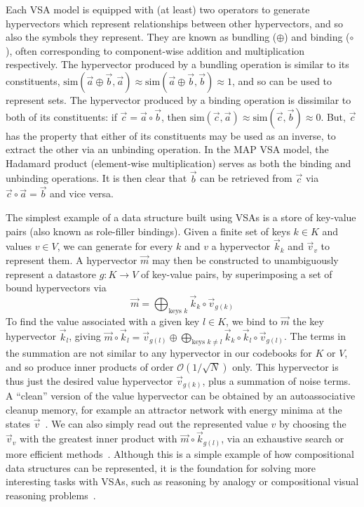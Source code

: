 Each VSA model is equipped with (at least) two operators to generate hypervectors which represent relationships between other hypervectors, and so also the symbols they represent. They are known as bundling ($\oplus$) and binding ($\circ$), often corresponding to component-wise addition and multiplication respectively. The hypervector produced by a bundling operation is similar to its constituents, $\mathrm{sim}(\vec{a} \oplus \vec{b}, \vec{a}) \approx \mathrm{sim}(\vec{a} \oplus \vec{b}, \vec{b}) \approx 1$, and so can be used to represent sets. The hypervector produced by a binding operation is dissimilar to both of its constituents: if $\vec{c} = \vec{a} \circ \vec{b}$, then  $\mathrm{sim}(\vec{c}, \vec{a}) \approx \mathrm{sim}(\vec{c}, \vec{b}) \approx 0$.
But, $\vec{c}$ has the property that either of its constituents may be used as an inverse, to extract the other via an unbinding operation. In the MAP VSA model, the Hadamard product (element-wise multiplication) serves as both the binding and unbinding operations. It is then clear that $\vec{b}$ can be retrieved from $\vec{c}$ via $\vec{c} \circ \vec{a} = \vec{b}$ and vice versa.

The simplest example of a data structure built using VSAs is a store of key-value pairs (also known as role-filler bindings). Given a finite set of keys $k \in K$ and values $v \in V$, we can generate for every $k$ and $v$ a hypervector $\vec{k}_k$ and $\vec{v}_v$ to represent them. A hypervector $\vec{m}$ may then be constructed to unambiguously represent a datastore $g : K \rightarrow V$ of key-value pairs, by superimposing a set of bound hypervectors via
\begin{equation}
    \vec{m} = \bigoplus_{\text{keys } k} \vec{k}_k \circ \vec{v}_{g(k)}
\end{equation}
To find the value associated with a given key $l \in K$, we bind to $\vec{m}$ the key hypervector $\vec{k}_l$, giving \mbox{$\vec{m} \circ \vec{k}_l = \vec{v}_{g(l)} \oplus \bigoplus_{\text{keys } k \neq l} \vec{k}_k \circ \vec{k}_l \circ \vec{v}_{g(l)}$}. The terms in the summation are not similar to any hypervector in our codebooks for $K$ or $V$, and so produce inner products of order $\mathcal{O} (1/\sqrt{N})$ only. This hypervector is thus just the desired value hypervector $\vec{v}_{g(k)}$, plus a summation of noise terms.
A ``clean'' version of the value hypervector can be obtained by an autoassociative cleanup memory, for example an attractor network with energy minima at the states $\vec{v}$~\cite{steinberg_associative_2022, gritsenko_neural_2017}. We can also simply read out the represented value $v$ by choosing the $\vec{v}_v$ with the greatest inner product with $\vec{m} \circ \vec{k}_{g(l)}$, via an exhaustive search or more efficient methods~\cite{frady_resonator_2020, raviv_linear_2024}. Although this is a simple example of how compositional data structures can be represented, it is the foundation for solving more interesting tasks with VSAs, such as reasoning by analogy or compositional visual reasoning problems~\cite{renner_neuromorphic_2022, hersche_neuro-vector-symbolic_2023, plate_analogy_2000}.

